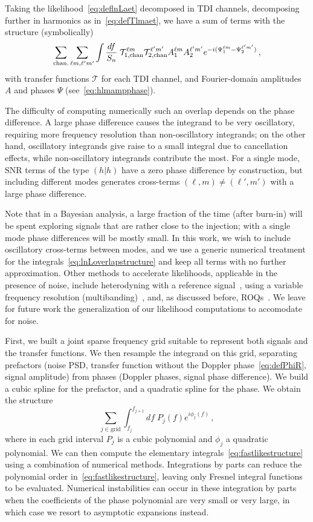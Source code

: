 \documentclass[aps,showpacs,twocolumn,prd,superscriptaddress,nofootinbib]{revtex4-1}
\newcommand{\be}{\begin{equation}}
\newcommand{\ee}{\end{equation}}
\newcommand\calT{{\mathcal{T}}}
\begin{document}
Taking the likelihood~\eqref{eq:deflnLaet} decomposed in TDI channels, decomposing further in harmonics as in~\eqref{eq:defTlmaet}, we have a sum of terms with the structure (symbolically)
\be
	\sum_{\rm chan.}\sum_{\ell m, \ell'm'}\int \frac{df}{S_{n}} \; \calT_{1, \mathrm{chan}}^{\ell m} \calT_{2, \mathrm{chan}}^{\ell' m'} A_{1}^{\ell m} A_{2}^{\ell' m'} e^{-i(\Psi_{1}^{\ell m} - \Psi_{2}^{\ell' m'})} \,,
\ee
with transfer functions $\calT$ for each TDI channel, and Fourier-domain amplitudes $A$ and phases $\Psi$ (see~\eqref{eq:hlmampphase}).

The difficulty of computing numerically such an overlap depends on the phase difference. A large phase difference causes the integrand to be very oscillatory, requiring more frequency resolution than non-oscillatory integrands; on the other hand, oscillatory integrands give raise to a small integral due to cancellation effects, while non-oscillatory integrands contribute the most. For a single mode, $\mathrm{SNR}$ terms of the type $(h|h)$ have a zero phase difference by construction, but including different modes generates cross-terms $(\ell, m) \neq (\ell', m')$ with a large phase difference.

Note that in a Bayesian analysis, a large fraction of the time (after burn-in) will be spent exploring signals that are rather close to the injection; with a single mode phase differences will be mostly small. In this work, we wish to include oscillatory cross-terms between modes, and we use a generic numerical treatment for the integrals~\eqref{eq:lnLoverlapstructure} and keep all terms with no further approximation. Other methods to accelerate likelihoods, applicable in the presence of noise, include heterodyning with a reference signal~\cite{Cornish10}, using a variable frequency resolution (multibanding)~\cite{Porter14, Vinciguerra+17}, and, as discussed before, ROQs~\cite{Smith+14, Canizares+14, Smith+16}. We leave for future work the generalization of our likelihood computations to accomodate for noise. 

First, we built a joint sparse frequency grid suitable to represent both signals and the transfer functions. We then resample the integrand on this grid, separating prefactors (noise PSD, transfer function without the Doppler phase~\eqref{eq:defPhiR}, signal amplitude) from phases (Doppler phases, signal phase difference). We build a cubic spline for the prefactor, and a quadratic spline for the phase. We obtain the structure
\be\label{eq:fastlikestructure}
	\sum_{j \in \mathrm{grid}} \int_{f_{j}}^{f_{j+1}} df \; P_{j} (f) e^{i \phi_{j} (f)} \,,
\ee
where in each grid interval $P_{j}$ is a cubic polynomial and $\phi_{j}$ a quadratic polynomial. We can then compute the elementary integrals~\eqref{eq:fastlikestructure} using a combination of numerical methods. Integrations by parts can reduce the polynomial order in~\eqref{eq:fastlikestructure}, leaving only Fresnel integral functions to be evaluated. Numerical instabilities can occur in these integration by parts when the coefficients of the phase polynomial are very small or very large, in which case we resort to asymptotic expansions instead.
\end{document}
